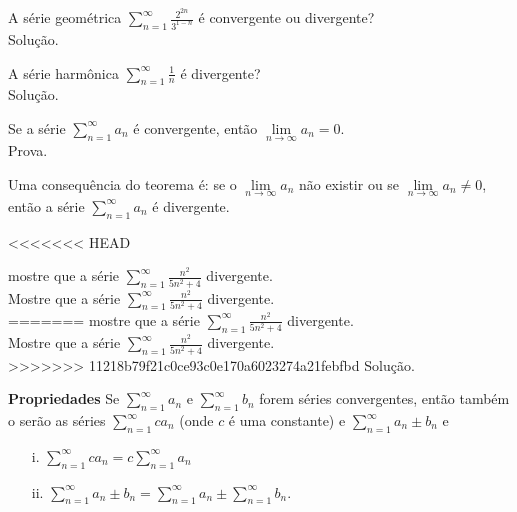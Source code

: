 \begin{ex}
	A série geométrica $\sum_{n=1}^{\infty}\frac{2^{2n}}{3^{1-n}}$ é convergente ou divergente?\\
	Solução.
\end{ex}
\vspace*{5cm}

\begin{ex}
	A série harmônica $\sum_{n=1}^{\infty}\frac{1}{n}$ é divergente?\\
	Solução.
\end{ex}
\vspace*{5cm}

\begin{teo}
	Se a série $\sum_{n=1}^{\infty} a_{n}$ é convergente, então $\lim\limits_{n\longrightarrow \infty} a_{n}=0$.\\
	Prova.
\end{teo}
\vspace*{5cm}

Uma consequência do teorema é: se o $\lim\limits_{n\longrightarrow \infty} a_{n}$ não existir ou se $\lim\limits_{n\longrightarrow \infty} a_{n}\neq 0$, então a série  $\sum_{n=1}^{\infty} a_{n}$ é divergente.
\begin{ex}
<<<<<<< HEAD

	mostre que a série $\sum_{n=1}^{\infty}\frac{n^{2}}{5n^{2}+4}$ divergente.\\

	Mostre que a série $\sum_{n=1}^{\infty}\frac{n^{2}}{5n^{2}+4}$ divergente.\\

=======
	mostre que a série $\sum_{n=1}^{\infty}\frac{n^{2}}{5n^{2}+4}$ divergente.\\
	Mostre que a série $\sum_{n=1}^{\infty}\frac{n^{2}}{5n^{2}+4}$ divergente.\\
>>>>>>> 11218b79f21c0ce93c0e170a6023274a21febfbd
	Solução.
\end{ex}
\vspace*{5cm}

\textbf{Propriedades} 
Se $\sum_{n=1}^{\infty} a_{n}$ e $\sum_{n=1}^{\infty} b_{n}$ forem séries convergentes, então também o serão as séries $\sum_{n=1}^{\infty} ca_{n}$ (onde $c$ é uma constante) e $\sum_{n=1}^{\infty} a_{n}\pm b_{n}$ e
\begin{itemize}
\item[i.] $\sum_{n=1}^{\infty} ca_{n}=c\sum_{n=1}^{\infty} a_{n}$

\item[ii.] $\sum_{n=1}^{\infty} a_{n}\pm b_{n}=\sum_{n=1}^{\infty} a_{n}\pm \sum_{n=1}^{\infty} b_{n}$.
\end{itemize}

